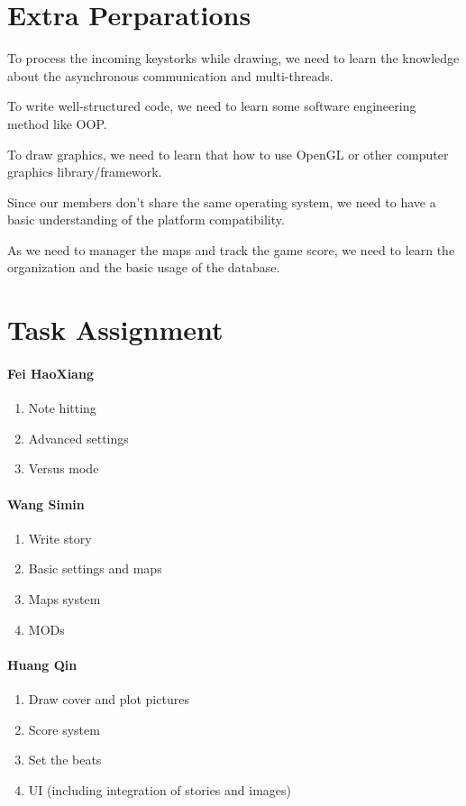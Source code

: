 \documentclass[12pt, a4paper]{article}
\begin{document}
\section{Extra Perparations}

To process the incoming keystorks while drawing,
we need to learn the knowledge about the asynchronous communication and
multi-threads.

To write well-structured code, we need to learn some software engineering
method like OOP\@.

To draw graphics, we need to learn that how to use OpenGL or other
computer graphics library/framework.

Since our members don't share the same operating system, we need to have
a basic understanding of the platform compatibility.

As we need to manager the maps and track the game score, we need to learn
the organization and the basic usage of the database.

\section{Task Assignment}

\paragraph{Fei HaoXiang}
\begin{enumerate}
  \item Note hitting
  \item Advanced settings
  \item Versus mode
\end{enumerate}

\paragraph{Wang Simin}
\begin{enumerate}
  \item Write story
  \item Basic settings and maps
  \item Maps system
  \item MODs
\end{enumerate}

\paragraph{Huang Qin}
\begin{enumerate}
  \item Draw cover and plot pictures
  \item Score system
  \item Set the beats 
  \item UI (including integration of stories and images)
\end{enumerate}
\end{document}
